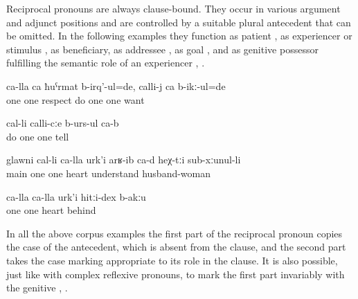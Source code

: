 Reciprocal pronouns are always clause-bound. They occur in various argument and adjunct positions and are controlled by a suitable plural antecedent that can be omitted. In the following examples they function as patient , as experiencer or stimulus , as beneficiary, as addressee , as goal , and as genitive possessor fulfilling the semantic role of an experiencer , . 
%
\begin{exe}
	\ex	\label{ex:‎They respected each other, loved each other}
	\gll	ca-lla	ca	ħuˁrmat	b-irq'-ul=de,	calli-j	ca	b-ikː-ul=de\\
		one	one	respect	do	one	one	want\\
	\glt	{}

	\ex	\label{ex:‎‎They talk to each other what they would do}
	\gll	[b-arq'-ib=el]	cal-li	calli-cːe	b-urs-ul	ca-b\\
		do	one	one	tell	\\
	\glt	{}

	\ex	\label{ex:‎The main point is that they understand each other, the couple}
	\gll	glawni	cal-li	ca-lla	urk'i	arʁ-ib	ca-d	heχ-tːi	sub-xːunul-li\\
		main	one	one	heart	understand			husband-woman\\
	\glt	{}

	\ex	\label{ex:There no bad feelings between each other}
	\gll	ca-lla	ca-lla	urk'i	hitːi-dex	b-akːu\\
		one	one	heart	behind	\\
	\glt	{} 
\end{exe}

In all the above corpus examples the first part of the reciprocal pronoun copies the case of the antecedent, which is absent from the clause, and the second part takes the case marking appropriate to its role in the clause. It is also possible, just like with complex reflexive pronouns, to mark the first part invariably with the genitive , .

